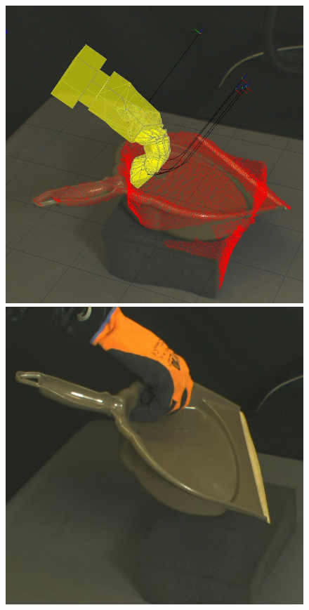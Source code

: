 \begin{figure}
\begin{center}
  \includegraphics[width=\tw]{images/experiments/query/dustpan-1-s}
 \includegraphics[width=\tw]{images/experiments/exec/dustpan-s}

\end{center}
\end{figure}
